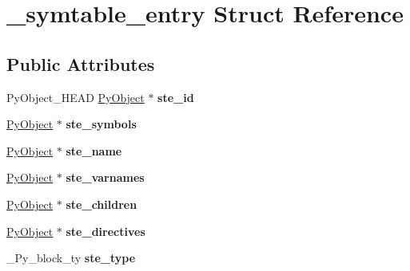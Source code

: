 \hypertarget{struct__symtable__entry}{}\section{\+\_\+symtable\+\_\+entry Struct Reference}
\label{struct__symtable__entry}
\subsection*{Public Attributes}
\begin{DoxyCompactItemize}
\item 
Py\+Object\+\_\+\+H\+E\+AD \hyperlink{struct__object}{Py\+Object} $\ast$ {\bfseries ste\+\_\+id}\hypertarget{struct__symtable__entry_a5592e20eb030643d8f0ac15eb2a420a8}{}\label{struct__symtable__entry_a5592e20eb030643d8f0ac15eb2a420a8}

\item 
\hyperlink{struct__object}{Py\+Object} $\ast$ {\bfseries ste\+\_\+symbols}\hypertarget{struct__symtable__entry_a9861a26aa97ecd761978f0945f597198}{}\label{struct__symtable__entry_a9861a26aa97ecd761978f0945f597198}

\item 
\hyperlink{struct__object}{Py\+Object} $\ast$ {\bfseries ste\+\_\+name}\hypertarget{struct__symtable__entry_a10a3fb305050313babc7322ffb401456}{}\label{struct__symtable__entry_a10a3fb305050313babc7322ffb401456}

\item 
\hyperlink{struct__object}{Py\+Object} $\ast$ {\bfseries ste\+\_\+varnames}\hypertarget{struct__symtable__entry_a7c4f7b2d6a187257a2966cf80c447d62}{}\label{struct__symtable__entry_a7c4f7b2d6a187257a2966cf80c447d62}

\item 
\hyperlink{struct__object}{Py\+Object} $\ast$ {\bfseries ste\+\_\+children}\hypertarget{struct__symtable__entry_a95a1b4f65170d448fe57a66fd73924f5}{}\label{struct__symtable__entry_a95a1b4f65170d448fe57a66fd73924f5}

\item 
\hyperlink{struct__object}{Py\+Object} $\ast$ {\bfseries ste\+\_\+directives}\hypertarget{struct__symtable__entry_a84da99847294a4a8608ac8078b4f1286}{}\label{struct__symtable__entry_a84da99847294a4a8608ac8078b4f1286}

\item 
\+\_\+\+Py\+\_\+block\+\_\+ty {\bfseries ste\+\_\+type}\hypertarget{struct__symtable__entry_a9a070f2be73f328f86b565c0d3a1439f}{}\label{struct__symtable__entry_a9a070f2be73f328f86b565c0d3a1439f}


\end{DoxyCompactItemize}
